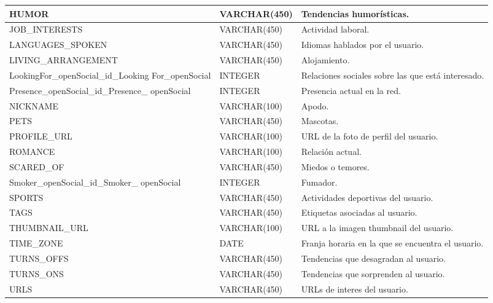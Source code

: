 \begin{center}
\begin{longtable}{|p{70mm} |l|p{60mm} |}
HUMOR & VARCHAR(450) & Tendencias humorísticas. \\ \hline
JOB\_INTERESTS & VARCHAR(450) & Actividad laboral.  \\ \hline
LANGUAGES\_SPOKEN & VARCHAR(450) &  Idiomas hablados por el usuario. \\ \hline
LIVING\_ARRANGEMENT & VARCHAR(450) &  Alojamiento. \\ \hline
LookingFor\_openSocial\_id\_Looking For\_openSocial & INTEGER &  Relaciones sociales sobre las que está interesado. \\ \hline
Presence\_openSocial\_id\_Presence\_ openSocial & INTEGER & Presencia actual en la red. \\ \hline
NICKNAME & VARCHAR(100) &  Apodo. \\ \hline
PETS & VARCHAR(450) & Mascotas. \\ \hline
PROFILE\_URL & VARCHAR(100) &  URL de la foto de perfil del usuario. \\ \hline
ROMANCE & VARCHAR(100) &  Relación actual. \\ \hline
SCARED\_OF & VARCHAR(450) &  Miedos o temores. \\ \hline
Smoker\_openSocial\_id\_Smoker\_ openSocial & INTEGER &  Fumador. \\ \hline
SPORTS & VARCHAR(450) & Actividades deportivas del usuario. \\ \hline
TAGS & VARCHAR(450) &  Etiquetas asociadas al usuario. \\ \hline
THUMBNAIL\_URL & VARCHAR(100) &  URL a la imagen thumbnail del usuario. \\ \hline
TIME\_ZONE & DATE &  Franja horaria en la que se encuentra el usuario. \\ \hline
TURNS\_OFFS & VARCHAR(450) &  Tendencias que desagradan al usuario. \\ \hline
TURNS\_ONS & VARCHAR(450) &  Tendencias que sorprenden al usuario.\\ \hline
URLS & VARCHAR(450) &  URLs de interes del usuario. \\ \hline

\end{longtable}
\end{center}

